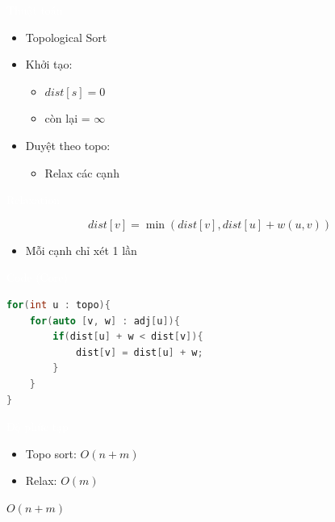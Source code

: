 \documentclass{beamer}
\newcommand{\hlred}[1]{\textcolor{myred}{#1}}
\newcommand{\hlwhite}[1]{\textcolor{white}{#1}}
\begin{document}

\begin{frame}{\hlwhite{Thuật toán}}
\begin{itemize}
\item Topological Sort
\item Khởi tạo:
\begin{itemize}
\item $dist[s] = 0$
\item còn lại = $\infty$
\end{itemize}

\item Duyệt theo topo:
\begin{itemize}
\item Relax các cạnh
\end{itemize}
\end{itemize}
\end{frame}


\begin{frame}{\hlwhite{Relaxation}}
\begin{tcolorbox}
\centering
\[
dist[v] = \min(dist[v], dist[u] + w(u,v))
\]
\end{tcolorbox}

\begin{itemize}
\item Mỗi cạnh chỉ xét 1 lần
\end{itemize}
\end{frame}


\begin{frame}[fragile]{\hlwhite{Code (Core)}}
\begin{lstlisting}[language=C++]
for(int u : topo){
    for(auto [v, w] : adj[u]){
        if(dist[u] + w < dist[v]){
            dist[v] = dist[u] + w;
        }
    }
}
\end{lstlisting}
\end{frame}


\begin{frame}{\hlwhite{Độ phức tạp}}
\begin{itemize}
\item Topo sort: $O(n + m)$
\item Relax: $O(m)$
\end{itemize}

\begin{tcolorbox}
\centering
\hlred{$O(n + m)$}
\end{tcolorbox}
\end{frame}
\end{document}
